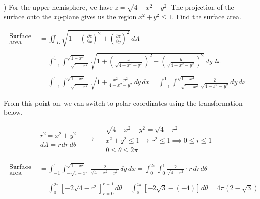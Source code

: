 \documentclass{article}
\begin{document}
\hfill

) For the upper hemisphere, we have $z=\sqrt{4-x^2-y^2}$. The projection of the surface onto the $xy$-plane gives us the region $x^2+y^2\leq1$. Find the surface area.

\begin{align*}
\begin{array}{c}
\text{Surface}\\\text{area}
\end{array}&=\iint_D\sqrt{1+\left(\frac{\partial z}{\partial x}\right)^2+\left(\frac{\partial z}{\partial y}\right)^2}\,dA\\\\&=\int_{-1}^1\int_{-\sqrt{1-x^2}}^{\sqrt{1-x^2}}\sqrt{1+\left(\frac{x}{\sqrt{4-x^2-y^2}}\right)^2+\left(\frac{y}{\sqrt{4-x^2-y^2}}\right)^2}\,dy\,dx\\\\&=\int_{-1}^1\int_{-\sqrt{1-x^2}}^{\sqrt{1-x^2}}\sqrt{1+\frac{x^2+y^2}{4-x^2-y^2}}\,dy\,dx=\int_{-1}^1\int_{-\sqrt{1-x^2}}^{\sqrt{1-x^2}}\frac2{\sqrt{4-x^2-y^2}}\,dy\,dx\end{align*}

\newpage

\noindent From this point on, we can switch to polar coordinates using the transformation below.

\[
\begin{array}{c}
r^2=x^2+y^2\\
dA=r\,dr\,d\theta
\end{array}\quad\rightarrow\quad
\begin{array}{c}
\sqrt{4-x^2-y^2}=\sqrt{4-r^2}\\[0.3cm]
x^2+y^2\leq1\,\rightarrow\,r^2\leq1\implies0\leq r\leq1\\[0.3cm]
0\leq\theta\leq2\pi
\end{array}
\]

\begin{align*}
\begin{array}{c}
\text{Surface}\\\text{area}
\end{array}&=\int_{-1}^1\int_{-\sqrt{1-x^2}}^{\sqrt{1-x^2}}\frac2{\sqrt{4-x^2-y^2}}\,dy\,dx=\int_0^{2\pi}\int_0^1\frac2{\sqrt{4-r^2}}\cdot r\,dr\,d\theta\\\\&=\int_0^{2\pi}\left[-2\sqrt{4-r^2}\right]_{r=0}^{r=1}\,d\theta=\int_0^{2\pi}\left[-2\sqrt3-\left(-4\right)\right]\,d\theta=\boxed{4\pi\left(2-\sqrt3\right)}\end{align*}
\end{document}
